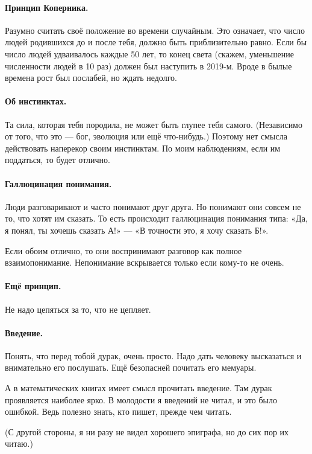 \documentclass{book}
\begin{document}
\paragraph{Принцип Коперника.}
Разумно считать своё положение во времени случайным.
Это означает, что число людей родившихся до и после тебя, должно быть приблизительно равно.
Если бы число людей удваивалось каждые 50 лет, то конец света (скажем, уменьшение численности людей в 10 раз) должен был наступить в 2019-м.
Вроде в былые времена рост был послабей, но ждать недолго.

\paragraph{Об инстинктах.}
Та сила, которая тебя породила, не может быть глупее тебя самого.
(Независимо от того, что это --- бог, эволюция или ещё что-нибудь.)
Поэтому нет смысла действовать наперекор своим инстинктам.
По моим наблюдениям, если им поддаться, то будет отлично. 

\paragraph{Галлюцинация понимания.}
Люди разговаривают и часто понимают друг друга.
Но понимают они совсем не то, что хотят им сказать.
То есть происходит галлюцинация понимания типа: «Да, я понял, ты хочешь сказать А!» --- «В точности это, я хочу сказать Б!».

Если обоим отлично, то они воспринимают разговор как полное взаимопонимание.
Непонимание вскрывается только если кому-то не очень.

\paragraph{Ещё принцип.}
Не надо цепяться за то, что не цепляет.

\paragraph{Введение.}
Понять, что перед тобой дурак, очень просто.
Надо дать человеку высказаться и внимательно его послушать.
Ещё безопасней почитать его мемуары.

А в математических книгах имеет смысл прочитать введение.
Там дурак проявляется наиболее ярко.
В молодости я введений не читал, и это было ошибкой. 
Ведь полезно знать, кто пишет, прежде чем читать.

(С другой стороны, я ни разу не видел хорошего эпиграфа, но до сих пор их читаю.)
\end{document}
